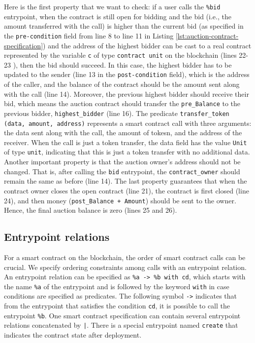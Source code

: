 \documentclass[a4paper,USenglish,cleveref, autoref,anonymous]{lipics-v2021}
\begin{document}
Here is the first property that we want to check: if a user calls the
\lstinline/%bid/ entrypoint, when the contract is still open for
bidding and the bid (i.e., the amount transferred with the call) is
higher than the current bid (as specified in the
\lstinline/pre-condition/ field from line 8 to line 11 in Listing
\ref{lst:auction-contract-specification}) and the address of the highest bidder can be cast to a real contract represented by the variable \lstinline/c/ of type \lstinline/contract unit/ on the blockchain (lines 22-23 ), then the bid should
succeed.  In this case, the highest bidder has to be updated to the
sender (line 13 in the \lstinline/post-condition/ field), which is the
address of the caller, and the balance of the contract should be the
amount sent along with the call (line 14). Moreover, the previous
highest bidder should receive their bid, which means the auction
contract should transfer the \lstinline/pre_Balance/ to the previous
bidder, \lstinline/highest_bidder/ (line 16). 
The predicate \lstinline/transfer_token (data, amount, address)/
represents a smart contract call with three arguments: the data sent
along with the call, the amount of tokesn, and the address of the
receiver.  When the call is just a token transfer, the data field has
the value \lstinline/Unit/ of type \lstinline/unit/, indicating that
this is just a token transfer with no additional data. Another
important property is that the auction owner's address should not be
changed. That is, after calling the \lstinline/bid/ entrypoint, the
\lstinline/contract_owner/ should remain the same as before (line
14). The last property guarantees that when the contract owner closes the open contract (line 21), the contract is first closed
(line 24), and then money (\lstinline/post_Balance + Amount/) should be sent to the
owner. Hence, the final auction balance is zero (lines 25 and 26).

\subsection{Entrypoint relations}
\label{sec:entrypoint-relations}
For a smart contract on the blockchain, the order of smart contract
calls can be crucial. We specify ordering constraints among calls with
an entrypoint relation. An entrypoint relation can be specified as
\lstinline/%a -> %b with cd/, which starts with the name
\lstinline/%a/ of the entrypoint and is followed by the keyword
\lstinline/with/ in case conditions are specified as predicates. The
following symbol \lstinline/->/ indicates that from the entrypoint
that satisfies the condition \lstinline/cd/, it is possible  to call
the entrypoint \lstinline/%b/. One smart contract specification can
contain several entrypoint relations concatenated by
\lstinline/|/. There is a special entrypoint named \lstinline/create/
that indicates the contract state after deployment. 
\end{document}

